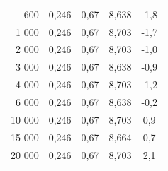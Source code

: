 \documentclass[a4paper, czech]{article}
\begin{document}
\begin{table}[H]
\begin{tabular}{rcccc}
        600        & 0,246                                                                       & 0,67                           & 8,638                                                        & -1,8                                                        \\
        1 000       & 0,246                                                                       & 0,67                           & 8,703                                                        & -1,7                                                        \\
        2 000       & 0,246                                                                       & 0,67                           & 8,703                                                        & -1,0                                                        \\
        3 000       & 0,246                                                                       & 0,67                           & 8,638                                                        & -0,9                                                        \\
        4 000       & 0,246                                                                       & 0,67                           & 8,703                                                        & -1,2                                                        \\
        6 000       & 0,246                                                                       & 0,67                           & 8,638                                                        & -0,2                                                        \\
        10 000      & 0,246                                                                       & 0,67                           & 8,703                                                        & 0,9                                                         \\
        15 000      & 0,246                                                                       & 0,67                           & 8,664                                                        & 0,7                                                         \\
        20 000      & 0,246                                                                       & 0,67                           & 8,703                                                        & 2,1                                                         \\

\end{tabular}
\end{table}
\end{document}
